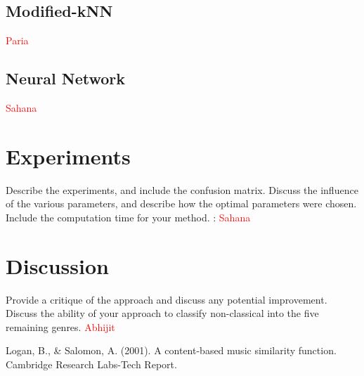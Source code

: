 \documentclass[12pt]{article}
\begin{document}
\subsection{Modified-kNN}\textcolor{red}{Paria}

\subsection{Neural Network}\textcolor{red}{Sahana}
\section{Experiments}
Describe the experiments, and include the confusion matrix. Discuss
the influence of the various parameters, and describe how the optimal
parameters were chosen. Include the computation time for your method. : \textcolor{red}{Sahana}
\section{Discussion}
Provide a critique of the approach and discuss any potential
improvement. Discuss the ability of your approach to classify
non-classical into the five remaining genres. \textcolor{red}{Abhijit}
\begin{thebibliography}{9}
	\label{logan}
	Logan, B., & Salomon, A. (2001). A content-based music similarity function. Cambridge Research Labs-Tech Report.
\end{thebibliography}
\end{document}
